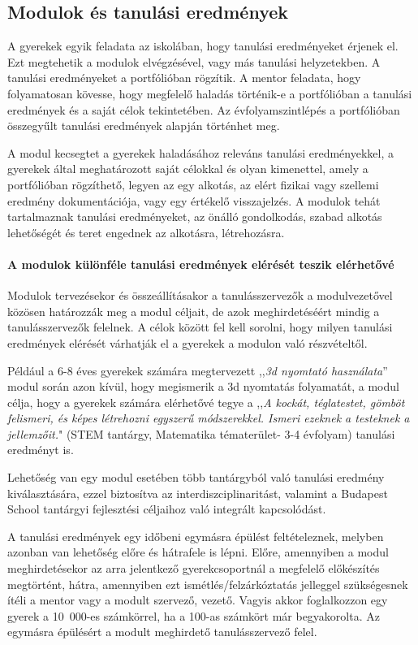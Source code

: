 \subsection{Modulok és tanulási eredmények}
\label{sec:modulok_es_tanulasi_eredmenyek}
A gyerekek egyik feladata az iskolában, hogy tanulási eredményeket
érjenek el. Ezt megtehetik a modulok elvégzésével, vagy más tanulási
helyzetekben.
A tanulási eredményeket a portfólióban rögzítik. A
mentor feladata, hogy folyamatosan kövesse, hogy megfelelő haladás
történik-e a portfólióban a tanulási eredmények és a saját célok
tekintetében. Az évfolyamszintlépés a portfólióban összegyűlt tanulási
eredmények alapján történhet meg.

A modul kecsegtet a gyerekek haladásához releváns tanulási
eredményekkel, a gyerekek által meghatározott saját célokkal és olyan
kimenettel, amely a portfólióban rögzíthető, legyen az egy alkotás, az
elért fizikai vagy szellemi eredmény dokumentációja, vagy egy értékelő
visszajelzés. A modulok tehát tartalmaznak tanulási eredményeket, az
önálló gondolkodás, szabad alkotás lehetőségét és teret engednek az
alkotásra, létrehozásra.

\paragraph{A modulok különféle tanulási eredmények elérését teszik
      elérhetővé}

Modulok tervezésekor és összeállításakor a tanulásszervezők a
modulvezetővel közösen határozzák meg a modul céljait, de azok
meghirdetéséért mindig a tanulásszervezők felelnek. A célok között fel
kell sorolni, hogy milyen tanulási eredmények elérését várhatják el a
gyerekek a modulon való részvételtől.

Például a 6-8 éves gyerekek számára megtervezett ,,\emph{3d nyomtató
      használata}'' modul során azon kívül, hogy megismerik a 3d nyomtatás
folyamatát, a modul célja, hogy a gyerekek számára elérhetővé tegye a
,,\emph{A kockát, téglatestet, gömböt felismeri, és képes létrehozni
      egyszerű módszerekkel. Ismeri ezeknek a testeknek a jellemzőit.}" (STEM
tantárgy, Matematika tématerület- 3-4 évfolyam) tanulási eredményt is.

Lehetőség van egy modul esetében több tantárgyból való tanulási eredmény
kiválasztására, ezzel biztosítva az interdiszciplinaritást, valamint a
Budapest School tantárgyi fejlesztési céljaihoz való integrált
kapcsolódást.

A tanulási eredmények egy időbeni egymásra épülést feltételeznek,
melyben azonban van lehetőség előre és hátrafele is lépni. Előre,
amennyiben a modul meghirdetésekor az arra jelentkező gyerekcsoportnál a
megfelelő előkészítés megtörtént, hátra, amennyiben ezt
ismétlés/felzárkóztatás jelleggel szükségesnek ítéli a mentor vagy a modult
szervező, vezető.
Vagyis akkor
foglalkozzon egy gyerek a 10~000-es számkörrel, ha a 100-as számkört már
begyakorolta. Az egymásra épülésért a modult meghirdető tanulásszervező
felel.

